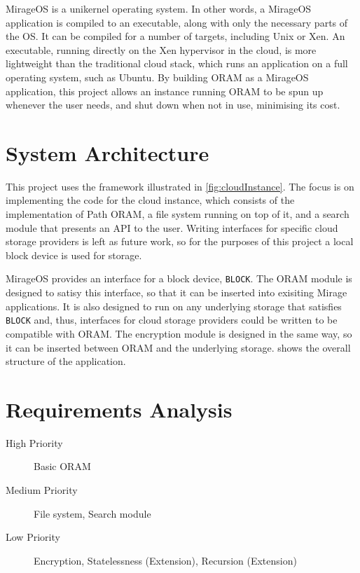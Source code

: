 \documentclass[12pt,a4paper,twoside,openright]{report}
\begin{document}
MirageOS is a unikernel operating system. In other words, a MirageOS application is compiled to an executable, along with only the necessary parts of the OS. It can be compiled for a number of targets, including Unix or Xen. An executable, running directly on the Xen hypervisor in the cloud, is more lightweight than the traditional cloud stack, which runs an application on a full operating system, such as Ubuntu. By building ORAM as a MirageOS application, this project allows an instance running ORAM to be spun up whenever the user needs, and shut down when not in use, minimising its cost.

\section{System Architecture}

This project uses the framework illustrated in \cref{fig:cloudInstance}. The focus is on implementing the code for the cloud instance, which consists of the implementation of Path ORAM, a file system running on top of it, and a search module that presents an API to the user. Writing interfaces for specific cloud storage providers is left as future work, so for the purposes of this project a local block device is used for storage.

MirageOS provides an interface for a block device, \texttt{BLOCK}. The ORAM module is designed to satisy this interface, so that it can be inserted into exisiting Mirage applications. It is also designed to run on any underlying storage that satisfies \texttt{BLOCK} and, thus, interfaces for cloud storage providers could be written to be compatible with ORAM. The encryption module is designed in the same way, so it can be inserted between ORAM and the underlying storage.  shows the overall structure of the application.

\setlength{\unitlength}{0.75mm}

\setlength{\unitlength}{0.5mm}

\section{Requirements Analysis}

\begin{description}
	\item [High Priority] Basic ORAM
	\item [Medium Priority] File system, Search module
	\item [Low Priority] Encryption, Statelessness (Extension), Recursion (Extension)
\end{description}
\end{document}

